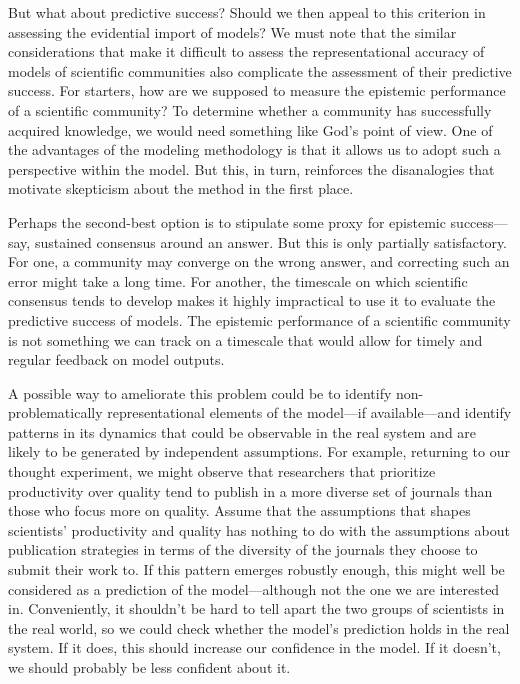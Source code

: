 \documentclass{article}
\begin{document}
But what about predictive success? Should we then appeal to this criterion in assessing the evidential import of models? We must note that the similar considerations that make it difficult to assess the representational accuracy of models of scientific communities also complicate the assessment of their predictive success. For starters, how are we supposed to measure the epistemic performance of a scientific community? To determine whether a community has successfully acquired knowledge, we would need something like God's point of view. One of the advantages of the modeling methodology is that it allows us to adopt such a perspective within the model. But this, in turn, reinforces the disanalogies that motivate skepticism about the method in the first place.

Perhaps the second-best option is to stipulate some proxy for epistemic success—say, sustained consensus around an answer. But this is only partially satisfactory. For one, a community may converge on the wrong answer, and correcting such an error might take a long time. For another, the timescale on which scientific consensus tends to develop makes it highly impractical to use it to evaluate the predictive success of models. The epistemic performance of a scientific community is not something we can track on a timescale that would allow for timely and regular feedback on model outputs.

A possible way to ameliorate this problem could be to identify non-problematically representational elements of the model—if available—and identify patterns in its dynamics that could be observable in the real system and are likely to be generated by independent assumptions. For example, returning to our thought experiment, we might observe that researchers that prioritize productivity over quality tend to publish in a more diverse set of journals than those who focus more on quality. Assume that the assumptions that shapes scientists' productivity and quality has nothing to do with the assumptions about publication strategies in terms of the diversity of the journals they choose to submit their work to. If this pattern emerges robustly enough, this might well be considered as a prediction of the model—although not the one we are interested in. Conveniently, it shouldn't be hard to tell apart the two groups of scientists in the real world, so we could check whether the model's prediction holds in the real system. If it does, this should increase our confidence in the model. If it doesn't, we should probably be less confident about it.
\end{document}
